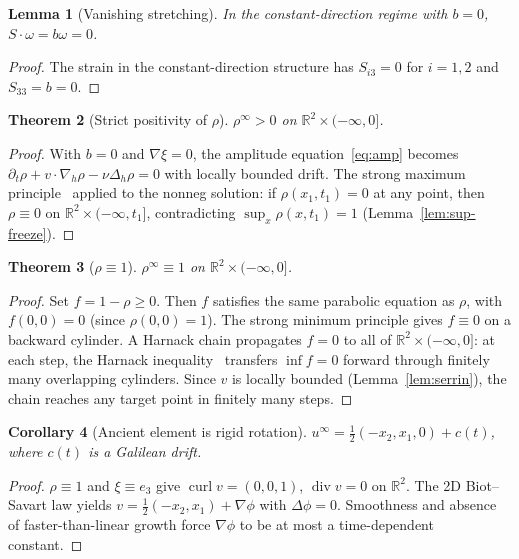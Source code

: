 \documentclass[12pt, reqno]{amsart}
\newtheorem{theorem}{Theorem}[section]
\newtheorem{lemma}[theorem]{Lemma}
\newtheorem{corollary}[theorem]{Corollary}
\theoremstyle{definition}
\theoremstyle{remark}
\numberwithin{equation}{section}
\newcommand{\R}{\mathbb{R}}
\DeclareMathOperator{\dv}{div}
\DeclareMathOperator{\curl}{curl}
\begin{document}
\begin{lemma}[Vanishing stretching]\label{lem:no-stretch}
In the constant-direction regime with $b=0$,
$S\cdot\omega=b\omega=0$.
\end{lemma}
\begin{proof}
The strain in the constant-direction structure has $S_{i3}=0$ for $i=1,2$
and $S_{33}=b=0$.
\end{proof}

\begin{theorem}[Strict positivity of $\rho$]\label{thm:rho-pos}
$\rho^\infty>0$ on $\R^2\times(-\infty,0]$.
\end{theorem}
\begin{proof}
With $b=0$ and $\nabla\xi=0$, the amplitude equation~\eqref{eq:amp}
becomes $\partial_t\rho+v\cdot\nabla_h\rho-\nu\Delta_h\rho=0$ with
locally bounded drift.  The strong maximum principle~\cite{Lieberman}
applied to the nonneg solution: if $\rho(x_1,t_1)=0$ at any point,
then $\rho\equiv 0$ on $\R^2\times(-\infty,t_1]$, contradicting
$\sup_x\rho(x,t_1)=1$ (Lemma~\ref{lem:sup-freeze}).
\end{proof}

\begin{theorem}[$\rho\equiv 1$]\label{thm:rho-one}
$\rho^\infty\equiv 1$ on $\R^2\times(-\infty,0]$.
\end{theorem}
\begin{proof}
Set $f=1-\rho\ge 0$.  Then $f$ satisfies the same parabolic equation as
$\rho$, with $f(0,0)=0$ (since $\rho(0,0)=1$).  The strong minimum
principle gives $f\equiv 0$ on a backward cylinder.  A Harnack chain
propagates $f=0$ to all of $\R^2\times(-\infty,0]$:
at each step, the Harnack inequality~\cite{Lieberman} transfers
$\inf f=0$ forward through finitely many overlapping cylinders.
Since $v$ is locally bounded (Lemma~\ref{lem:serrin}), the chain reaches
any target point in finitely many steps.
\end{proof}

\begin{corollary}[Ancient element is rigid rotation]\label{cor:rigid}
$u^\infty=\tfrac12(-x_2,x_1,0)+c(t)$, where $c(t)$ is a Galilean drift.
\end{corollary}
\begin{proof}
$\rho\equiv 1$ and $\xi\equiv e_3$ give $\curl v=(0,0,1)$,
$\dv v=0$ on $\R^2$.
The 2D Biot--Savart law yields $v=\tfrac12(-x_2,x_1)+\nabla\phi$ with
$\Delta\phi=0$.  Smoothness and absence of faster-than-linear growth
force $\nabla\phi$ to be at most a time-dependent constant.
\end{proof}
\end{document}
